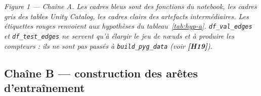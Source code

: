 \documentclass[11pt,a4paper]{article}
\newcommand{\code}[1]{\texttt{\small #1}}
\newcommand{\hyp}[1]{\textcolor{hypcol}{\textbf{\small [#1]}}}
\begin{document}
\begin{center}
\parbox{0.92\textwidth}{\footnotesize\itshape
Figure 1 --- Chaîne A. Les cadres bleus sont des fonctions du notebook, les cadres
gris des tables Unity Catalog, les cadres clairs des artefacts intermédiaires. Les
étiquettes rouges renvoient aux hypothèses du
tableau~\ref{tab:hyp-a}. \code{df\_val\_edges} et \code{df\_test\_edges} ne servent
qu'à élargir le jeu de nœuds et à produire les compteurs : ils ne sont pas passés à
\code{build\_pyg\_data} (voir \hyp{H19}).}
\end{center}

\clearpage
\subsection{Chaîne B --- construction des arêtes d'entraînement}
\end{document}
